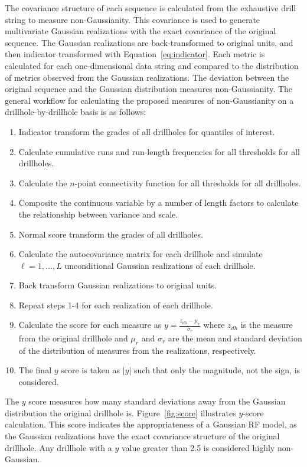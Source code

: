 The covariance structure of each sequence is calculated from the exhaustive drill string to measure non-Gaussianity. This covariance is used to generate multivariate Gaussian realizations with the exact covariance of the original sequence. The Gaussian realizations are back-transformed to original units, and then indicator transformed with Equation~\ref{eq:indicator}. Each metric is calculated for each one-dimensional data string and compared to the distribution of metrics observed from the Gaussian realizations. The deviation between the original sequence and the Gaussian distribution measures non-Gaussianity. The general workflow for calculating the proposed measures of non-Gaussianity on a drillhole-by-drillhole basis is as follows:
\begin{enumerate}[noitemsep]
    \item Indicator transform the grades of all drillholes for quantiles of interest.
    \item Calculate cumulative runs and run-length frequencies for all thresholds for all drillholes.
    \item Calculate the $n$-point connectivity function for all thresholds for all drillholes.
    \item Composite the continuous variable by a number of length factors to calculate the relationship between variance and scale.
    \item Normal score transform the grades of all drillholes.
    \item Calculate the autocovariance matrix for each drillhole and simulate $\ell=1,\dots,L$ unconditional Gaussian realizations of each drillhole.
    \item Back transform Gaussian realizations to original units.
    \item Repeat steps 1-4 for each realization of each drillhole.
    \item Calculate the score for each measure as $y = \frac{z_{dh}-\mu_{r}}{\sigma_{r}}$ where $z_{dh}$ is the measure from the original drillhole and $\mu_{r}$ and $\sigma_{r}$ are the mean and standard deviation of the distribution of measures from the realizations, respectively.
    \item The final $y$ score is taken as $\lvert y \rvert$ such that only the magnitude, not the sign, is considered.
\end{enumerate}

The $y$ score measures how many standard deviations away from the Gaussian distribution the original drillhole is. Figure~\ref{fig:score} illustrates $y$-score calculation. This score indicates the appropriateness of a Gaussian \gls{RF} model, as the Gaussian realizations have the exact covariance structure of the original drillhole. Any drillhole with a $y$ value greater than 2.5 is considered highly non-Gaussian.

